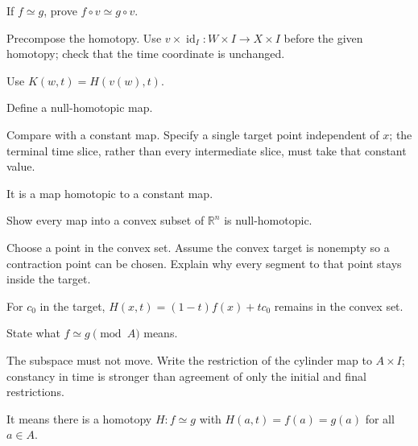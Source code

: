 \begin{exercise}\label{exr:viii01-10}
If \(f\simeq g\), prove \(f\circ v\simeq g\circ v\).
\end{exercise}
\begin{hint}Precompose the homotopy.
Use \(v\times\operatorname{id}_I:W\times I\to X\times I\) before the given homotopy; check that the time coordinate is unchanged.
\end{hint}
\begin{solution}
Use \(K(w,t)=H(v(w),t)\).
\end{solution}

\begin{exercise}\label{exr:viii01-11}
Define a null-homotopic map.
\end{exercise}
\begin{hint}Compare with a constant map.
Specify a single target point independent of \(x\); the terminal time slice, rather than every intermediate slice, must take that constant value.
\end{hint}
\begin{solution}
It is a map homotopic to a constant map.
\end{solution}

\begin{exercise}\label{exr:viii01-12}
Show every map into a convex subset of \(\mathbb R^n\) is null-homotopic.
\end{exercise}
\begin{hint}Choose a point in the convex set.
Assume the convex target is nonempty so a contraction point can be chosen. Explain why every segment to that point stays inside the target.
\end{hint}
\begin{solution}
For \(c_0\) in the target, \(H(x,t)=(1-t)f(x)+tc_0\) remains in the convex set.
\end{solution}

\begin{exercise}\label{exr:viii01-13}
State what \(f\simeq g\pmod A\) means.
\end{exercise}
\begin{hint}The subspace must not move.
Write the restriction of the cylinder map to \(A\times I\); constancy in time is stronger than agreement of only the initial and final restrictions.
\end{hint}
\begin{solution}
It means there is a homotopy \(H:f\simeq g\) with
\(H(a,t)=f(a)=g(a)\) for all \(a\in A\).
\end{solution}

